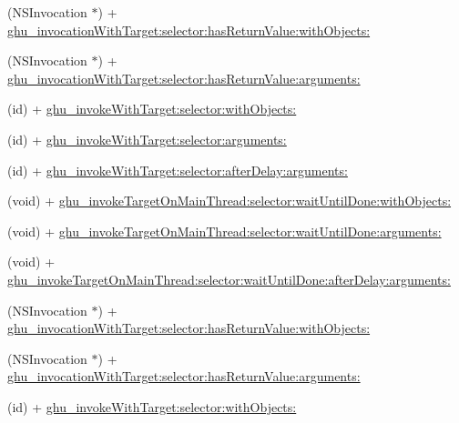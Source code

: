 \begin{DoxyCompactItemize}
\item 
(\-N\-S\-Invocation $\ast$) + \hyperlink{interface_n_s_invocation_07_g_h_utils___g_h_u_n_i_t_08_a31d3598ec7e21face3cb783c2c60b42c}{ghu\-\_\-invocation\-With\-Target\-:selector\-:has\-Return\-Value\-:with\-Objects\-:}
\item 
(\-N\-S\-Invocation $\ast$) + \hyperlink{interface_n_s_invocation_07_g_h_utils___g_h_u_n_i_t_08_a64dcd5d1f117118b02213db0846092d9}{ghu\-\_\-invocation\-With\-Target\-:selector\-:has\-Return\-Value\-:arguments\-:}
\item 
(id) + \hyperlink{interface_n_s_invocation_07_g_h_utils___g_h_u_n_i_t_08_af60de644c62297e237a21adf2ea75e80}{ghu\-\_\-invoke\-With\-Target\-:selector\-:with\-Objects\-:}
\item 
(id) + \hyperlink{interface_n_s_invocation_07_g_h_utils___g_h_u_n_i_t_08_a0aa9a0433b00c60a8174c7bed363821f}{ghu\-\_\-invoke\-With\-Target\-:selector\-:arguments\-:}
\item 
(id) + \hyperlink{interface_n_s_invocation_07_g_h_utils___g_h_u_n_i_t_08_a7f856b1af207762c610e597941411091}{ghu\-\_\-invoke\-With\-Target\-:selector\-:after\-Delay\-:arguments\-:}
\item 
(void) + \hyperlink{interface_n_s_invocation_07_g_h_utils___g_h_u_n_i_t_08_a6933a1f0fd7d0d4b8f133baf53f30a31}{ghu\-\_\-invoke\-Target\-On\-Main\-Thread\-:selector\-:wait\-Until\-Done\-:with\-Objects\-:}
\item 
(void) + \hyperlink{interface_n_s_invocation_07_g_h_utils___g_h_u_n_i_t_08_a261cd5aa6061478716fba4f79cb4f69b}{ghu\-\_\-invoke\-Target\-On\-Main\-Thread\-:selector\-:wait\-Until\-Done\-:arguments\-:}
\item 
(void) + \hyperlink{interface_n_s_invocation_07_g_h_utils___g_h_u_n_i_t_08_a0b891f27c084f6677907e0f907caf5f9}{ghu\-\_\-invoke\-Target\-On\-Main\-Thread\-:selector\-:wait\-Until\-Done\-:after\-Delay\-:arguments\-:}
\item 
(\-N\-S\-Invocation $\ast$) + \hyperlink{interface_n_s_invocation_07_g_h_utils___g_h_u_n_i_t_08_a31d3598ec7e21face3cb783c2c60b42c}{ghu\-\_\-invocation\-With\-Target\-:selector\-:has\-Return\-Value\-:with\-Objects\-:}
\item 
(\-N\-S\-Invocation $\ast$) + \hyperlink{interface_n_s_invocation_07_g_h_utils___g_h_u_n_i_t_08_a64dcd5d1f117118b02213db0846092d9}{ghu\-\_\-invocation\-With\-Target\-:selector\-:has\-Return\-Value\-:arguments\-:}
\item 
(id) + \hyperlink{interface_n_s_invocation_07_g_h_utils___g_h_u_n_i_t_08_af60de644c62297e237a21adf2ea75e80}{ghu\-\_\-invoke\-With\-Target\-:selector\-:with\-Objects\-:}

\end{DoxyCompactItemize}
